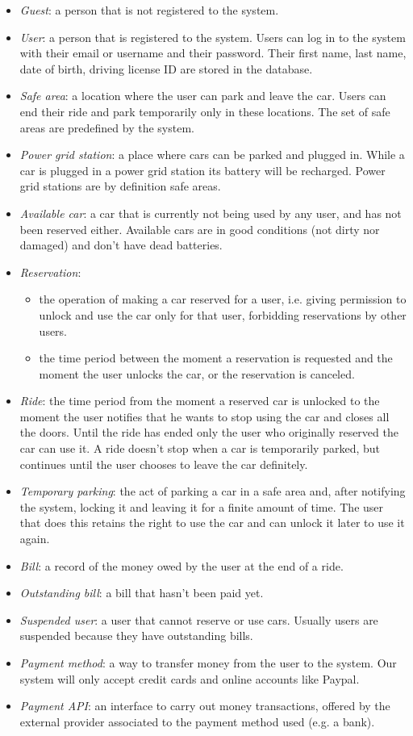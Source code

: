 \documentclass[english]{article}
\begin{document}
\begin{itemize}
\item{\textit{Guest}: a person that is not registered to the system.}
\item{\textit{User}: a person that is registered to the system. Users can log in to the system with their email or username and their password. Their first name, last name, date of birth, driving license ID are stored in the database.}
\item{\textit{Safe area}: a location where the user can park and leave the car. Users can end their ride and park temporarily only in these locations. The set of safe areas are predefined by the system.}
\item{\textit{Power grid station}: a place where cars can be parked and plugged in. While a car is plugged in a power grid station its battery will be recharged. Power grid stations are by definition safe areas.}
\item{\textit{Available car}: a car that is currently not being used by any user, and has not been reserved either. Available cars are in good conditions (not dirty nor damaged) and don’t have dead batteries.}
\item{\textit{Reservation}:
	\begin{itemize}
		\item{the operation of making a car reserved for a user, i.e. giving permission to unlock and use the car only for that user, forbidding reservations by other users.}
		\item{the time period between the moment a reservation is requested and the moment the user unlocks the car, or the reservation is canceled.}
	\end{itemize}
}
\item{\textit{Ride}: the time period from the moment a reserved car is unlocked to the moment the user notifies that he wants to stop using the car and closes all the doors. Until the ride has ended only the user who originally reserved the car can use it. A ride doesn’t stop when a car is temporarily parked, but continues until the user chooses to leave the car definitely.}
\item{\textit{Temporary parking}: the act of parking a car in a safe area and, after notifying the system, locking it and leaving it for a finite amount of time. The user that does this retains the right to use the car and can unlock it later to use it again.}
\item{\textit{Bill}: a record of the money owed by the user at the end of a ride.}
\item{\textit{Outstanding bill}: a bill that hasn’t been paid yet. }
\item{\textit{Suspended user}: a user that cannot reserve or use cars. Usually users are suspended because they have outstanding bills.}
\item{\textit{Payment method}: a way to transfer money from the user to the system. Our system will only accept credit cards and online accounts like Paypal.}
\item{\textit{Payment API}: an interface to carry out money transactions, offered by the external provider associated to the payment method used (e.g. a bank).}
\end{itemize}
\end{document}

